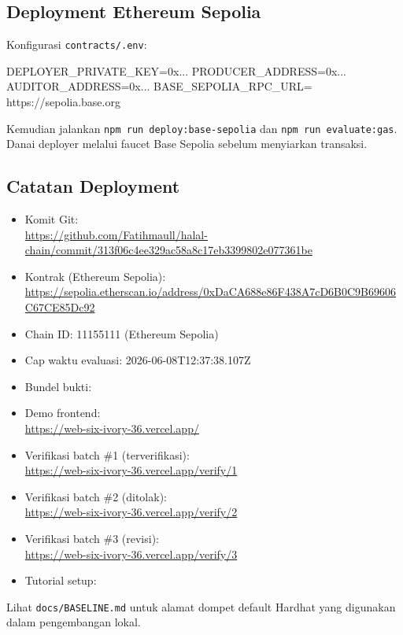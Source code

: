 \subsection{Deployment Ethereum Sepolia}
Konfigurasi \texttt{contracts/.env}:
\begin{Code}
DEPLOYER_PRIVATE_KEY=0x...
PRODUCER_ADDRESS=0x...
AUDITOR_ADDRESS=0x...
BASE_SEPOLIA_RPC_URL=
  https://sepolia.base.org
\end{Code}
Kemudian jalankan \texttt{npm run deploy:base-sepolia} dan \texttt{npm run evaluate:gas}.
Danai deployer melalui faucet Base Sepolia sebelum menyiarkan transaksi.

\subsection{Catatan Deployment}
\begin{itemize}
  \item Komit Git:\\
  \url{https://github.com/Fatihmaull/halal-chain/commit/313f06c4ee329ac58a8c17eb3399802e077361be}
  \item Kontrak (Ethereum Sepolia):\\
  \url{https://sepolia.etherscan.io/address/0xDaCA688e86F438A7cD6B0C9B69606C67CE85Dc92}
  \item Chain ID: 11155111 (Ethereum Sepolia)
  \item Cap waktu evaluasi: 2026-06-08T12:37:38.107Z
  \item Bundel bukti: 
  \item Demo frontend:\\
  \url{https://web-six-ivory-36.vercel.app/}
  \item Verifikasi batch \#1 (terverifikasi):\\
  \url{https://web-six-ivory-36.vercel.app/verify/1}
  \item Verifikasi batch \#2 (ditolak):\\
  \url{https://web-six-ivory-36.vercel.app/verify/2}
  \item Verifikasi batch \#3 (revisi):\\
  \url{https://web-six-ivory-36.vercel.app/verify/3}
  \item Tutorial setup: 
\end{itemize}

Lihat \texttt{docs/BASELINE.md} untuk alamat dompet default Hardhat yang digunakan dalam pengembangan lokal.
